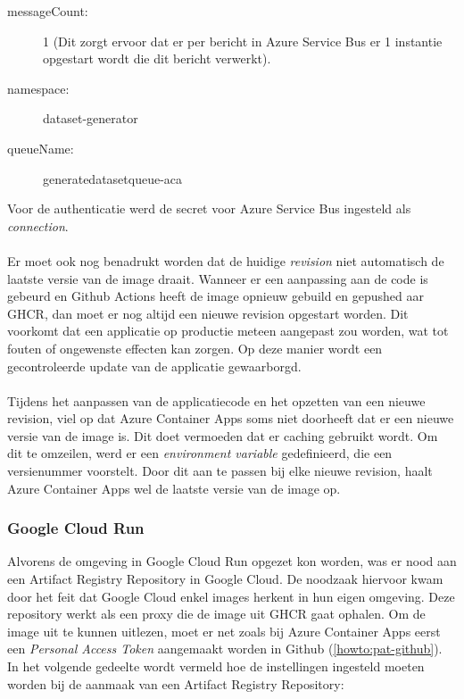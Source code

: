 \begin{description}
    \item[messageCount:] 1 (Dit zorgt ervoor dat er per bericht in Azure Service Bus er 1 instantie opgestart wordt die dit bericht verwerkt).
    \item[namespace:] dataset-generator 
    \item[queueName:] generatedatasetqueue-aca
\end{description}
 
Voor de authenticatie werd de secret voor Azure Service Bus ingesteld als \textit{connection}.
\\
\\
Er moet ook nog benadrukt worden dat de huidige \textit{revision} niet automatisch de laatste versie van de image draait. Wanneer er een aanpassing aan de code is gebeurd en Github Actions heeft de image opnieuw gebuild en gepushed aar GHCR, dan moet er nog altijd een nieuwe revision opgestart worden. Dit voorkomt dat een applicatie op productie meteen aangepast zou worden, wat tot fouten of ongewenste effecten kan zorgen. Op deze manier wordt een gecontroleerde update van de applicatie gewaarborgd.
\\ 
\\
Tijdens het aanpassen van de applicatiecode en het opzetten van een nieuwe revision, viel op dat Azure Container Apps soms niet doorheeft dat er een nieuwe versie van de image is. Dit doet vermoeden dat er caching gebruikt wordt. Om dit te omzeilen, werd er een \textit{environment variable} gedefinieerd, die een versienummer voorstelt. Door dit aan te passen bij elke nieuwe revision, haalt Azure Container Apps wel de laatste versie van de image op.

\subsubsection*{Google Cloud Run}

Alvorens de omgeving in Google Cloud Run opgezet kon worden, was er nood aan een Artifact Registry Repository in Google Cloud. De noodzaak hiervoor kwam door het feit dat Google Cloud enkel images herkent in hun eigen omgeving. Deze repository werkt als een proxy die de image uit GHCR gaat ophalen. Om de image uit te kunnen uitlezen, moet er net zoals bij Azure Container Apps eerst een \textit{Personal Access Token} aangemaakt worden in Github (\ref{howto:pat-github}). In het volgende gedeelte wordt vermeld hoe de instellingen ingesteld moeten worden bij de aanmaak van een Artifact Registry Repository:

